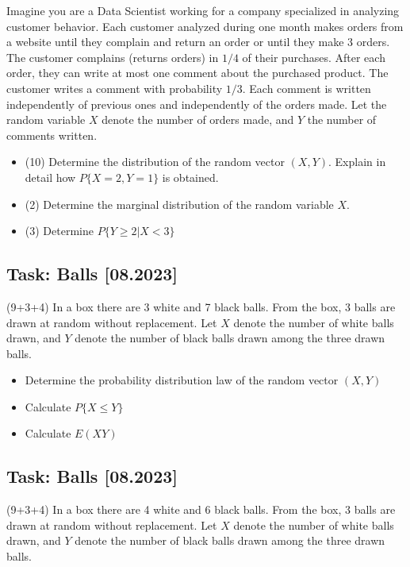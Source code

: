 \documentclass[a4paper, 12pt]{article}
\begin{document}
Imagine you are a Data Scientist working for a company specialized in analyzing customer behavior. Each customer analyzed during one month makes orders from a website until they complain and return an order or until they make 3 orders. The customer complains (returns orders) in $1/4$ of their purchases. After each order, they can write at most one comment about the purchased product. The customer writes a comment with probability $1/3$. Each comment is written independently of previous ones and independently of the orders made. Let the random variable $X$ denote the number of orders made, and $Y$ the number of comments written.

\begin{itemize}
\item [a)] (10) Determine the distribution of the random vector $(X, Y)$. Explain in detail how $P\{X = 2, Y = 1\}$ is obtained.
\item [b)] (2) Determine the marginal distribution of the random variable $X$.
\item [c)] (3) Determine $P\{Y \geq 2 | X < 3\}$
\end{itemize}


\subsection*{Task: Balls [08.2023]}

(9+3+4) In a box there are 3 white and 7 black balls. From the box, 3 balls are drawn at random without replacement. Let $X$ denote the number of white balls drawn, and $Y$ denote the number of black balls drawn among the three drawn balls.

\begin{itemize}
    \item [a)] Determine the probability distribution law of the random vector $(X, Y)$
    \item [b)] Calculate $P\{X \leq Y\}$
    \item [c)] Calculate $E(XY)$
\end{itemize}


\subsection*{Task: Balls [08.2023]}

(9+3+4) In a box there are 4 white and 6 black balls. From the box, 3 balls are drawn at random without replacement. Let $X$ denote the number of white balls drawn, and $Y$ denote the number of black balls drawn among the three drawn balls.
\end{document}
